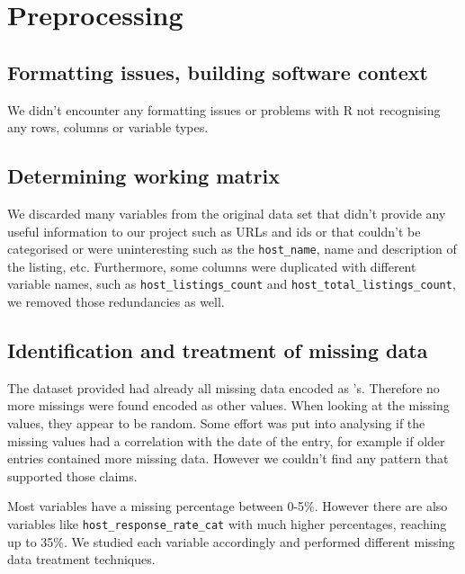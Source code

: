 

\section{Preprocessing}%
\label{sec:preprocessing}


\subsection{Formatting issues, building software context}

We didn't encounter any formatting issues or problems with R not recognising
any rows, columns or variable types.

\subsection{Determining working matrix}%
\label{ssub:work_matrix}

We discarded many variables from the original data set that didn't provide any
useful information to our project such as URLs and ids or that couldn't be
categorised or were uninteresting such as the \texttt{host\_name}, name and
description of the listing, etc. Furthermore, some columns were duplicated with
different variable names, such as \texttt{host\_listings\_count} and
\texttt{host\_total\_listings\_count}, we removed those redundancies as well.

\subsection{Identification and treatment of missing data}

The dataset provided had already all missing data encoded as \NA's. Therefore no
more missings were found encoded as other values. When looking at the missing
values, they appear to be random. Some effort was put into analysing if the missing values had a correlation with the date of the entry, for example if older entries contained more missing data. However we couldn't find any pattern that supported those claims.

Most variables have a missing percentage between 0-5\%. However there are also
variables like \texttt{host\_response\_rate\_cat} with much higher percentages,
reaching up to 35\%. We studied each variable accordingly and performed different missing data treatment techniques.

